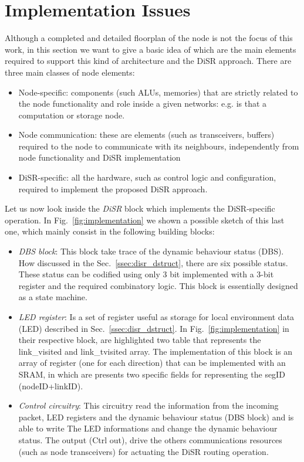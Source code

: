 
\section{Implementation Issues}
\label{sec:implementation}
Although a completed and detailed floorplan of the node is not the
focus of this work, in this section we want to give a basic idea of
which are the main elements required to support this kind of
architecture and the DiSR approach. There are three main classes of
node elements:
\begin{itemize}
\item Node-specific: components (such ALUs, memories) that are
strictly related to the node functionality and role inside a given
networks: e.g. is that a computation or storage node.
\item Node communication:  these are elements (such as transceivers,
buffers) required to the node to communicate with its neighbours,
independently from node functionality and DiSR implementation
\item DiSR-specific: all the hardware, such as control logic and
configuration, required to implement the proposed DiSR approach.
\end{itemize}


Let us now look inside the \emph{DiSR} block which implements the DiSR-specific
operation. In Fig.~\ref{fig:implementation} we shown a possible sketch of this 
last one, which mainly consist in the following building blocks:

\begin{itemize}
\item \emph{DBS block}: This block take trace of the dynamic behaviour status (DBS). 
      How discussed in the Sec.~\ref{ssec:disr_dstruct}, there are six possible status. 
      These status can be codified using only 3 bit implemented with a 3-bit register 
      and the required combinatory logic. This block is essentially designed as a state machine.
\item \emph{LED register}: Is a set of register useful as storage for local environment data (LED)
      described in Sec.~\ref{ssec:disr_dstruct}. In Fig.~\ref{fig:implementation} in their 
      respective block, are highlighted two table that represents the link\_visited 
      and link\_tvisited array. The implementation of this block is an array of register 
      (one for each direction) that can be implemented with an SRAM, in which are presents two 
      specific fields  for representing the segID (nodeID+linkID). 
\item \emph{Control circuitry}: This circuitry read the information from the incoming packet, 
      LED registers and the dynamic behaviour status (DBS block) and is able to write The LED
      informations and change the dynamic behaviour status. The output (Ctrl out), drive 
      the others communications resources (such as node transceivers) for actuating the DiSR 
      routing operation.
\end{itemize}

